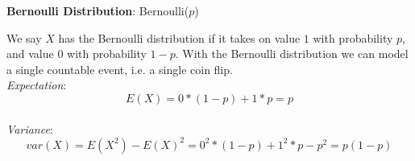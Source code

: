 \vspace{2 mm}
\textbf{Bernoulli Distribution}: Bernoulli($p$)

We say $X$ has the Bernoulli distribution if it takes on value $1$ with probability $p$, and value $0$ with probability $1-p$. With the Bernoulli distribution we can model a single countable event, i.e. a single coin flip.
\\
\textit{Expectation}:
$$E(X) = 0*(1-p) + 1*p = p$$
\\
\textit{Variance}:
$$var(X) = E(X^2) - E(X)^2 = 0^2 * (1-p) + 1^2 * p - p^2 = p(1-p)$$